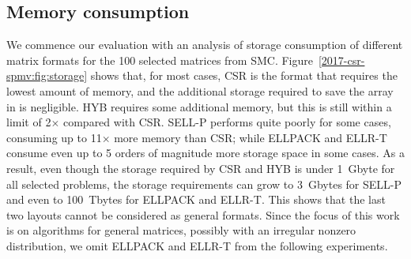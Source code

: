 \subsection{Memory consumption}

We commence our evaluation with an analysis of storage consumption
of different matrix formats for the 100 selected matrices from SMC.
Figure~\ref{2017-csr-spmv:fig:storage} shows that,
for most cases, CSR is the format that requires the lowest amount of memory,
and the additional storage required to save the \srow array in \bcsr
is negligible.
HYB requires some additional memory,
but this is still within a limit
of 2$\times$ compared with CSR.
SELL-P performs quite poorly for some cases,
consuming up to 11$\times$ more memory than CSR;
while ELLPACK and ELLR-T consume even up to 5 orders of magnitude more
storage space in some cases.
As a result, even though the storage required by CSR and HYB is under 1~Gbyte
for all selected problems, the storage requirements can grow to 3~Gbytes for SELL-P
and even to 100~Tbytes for ELLPACK and ELLR-T.
This shows that the last two layouts cannot be considered as general formats.
Since the focus of this work is on \spmv algorithms
for general matrices,
possibly with an irregular nonzero distribution,
we omit ELLPACK and ELLR-T from the following experiments.

